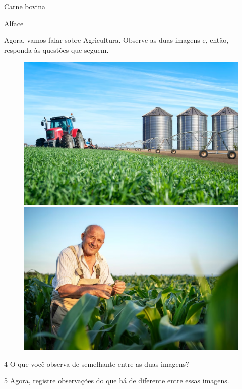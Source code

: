 \begin{itemize}
\begin{itemize}
\begin{itemize}
\begin{itemize}
{{\begin{itemize}
\begin{itemize}
\begin{multicols}{2}
Carne bovina

Alface
\end{multicols}


Agora, vamos falar sobre Agricultura. Observe as duas imagens e, então, responda às questões que seguem.

\begin{figure}[htpb!]
\includegraphics[width=.5\textwidth]{./imgs/img57.png}
\includegraphics[width=.5\textwidth]{./imgs/img58.png}
\caption{}
\end{figure}


\num{4} O que você observa de semelhante entre as duas imagens?


\num{5} Agora, registre observações do que há de diferente entre essas imagens.



\end{itemize}
\end{itemize}}}
\end{itemize}
\end{itemize}
\end{itemize}
\end{itemize}
